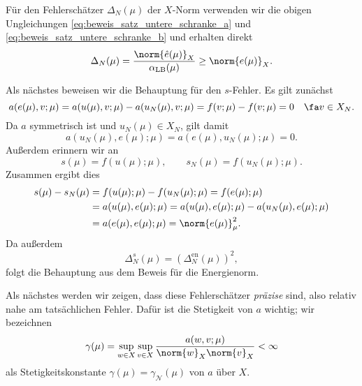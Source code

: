\begin{Satz}
\begin{Beweis}
        Für den Fehlerschätzer $\Delta_N(\mu)$ der $X$-Norm verwenden wir die obigen Ungleichungen \eqref{eq:beweis_satz_untere_schranke_a} und \eqref{eq:beweis_satz_untere_schranke_b} und erhalten direkt
        \begin{equation}
            \Delta_N(\mu) = \frac{\norm{\hat e(\mu)}_X}{\alpha_\text{LB}(\mu)} \geq \norm{e(\mu)}_X.
        \end{equation}

        Als nächstes beweisen wir die Behauptung für den $s$-Fehler. Es gilt zunächst
        \begin{equation}
            a(e(\mu), v; \mu) = a(u(\mu), v; \mu) - a(u_N(\mu), v; \mu) = f(v; \mu) - f(v; \mu) = 0 \quad \fa v \in X_N.
        \end{equation}
        Da $a$ symmetrisch ist und $u_N(\mu) \in X_N$, gilt damit
        \begin{equation}
            a(u_N(\mu), e(\mu); \mu) = a(e(\mu), u_N(\mu); \mu) = 0.
        \end{equation}
        Außerdem erinnern wir an
        \begin{equation}
            s(\mu) = f(u(\mu); \mu), \qquad s_N(\mu) = f(u_N(\mu); \mu).
        \end{equation}
        Zusammen ergibt dies
        \begin{align}
            s(\mu) - s_N(\mu) &= f(u(\mu); \mu) - f(u_N(\mu); \mu) = f(e(\mu); \mu) \\
            &= a(u(\mu), e(\mu); \mu) = a(u(\mu), e(\mu); \mu) - a(u_N(\mu), e(\mu); \mu)\\
            &= a(e(\mu), e(\mu); \mu) = \norm{e(\mu)}_{\mu}^2.
        \end{align}
        Da außerdem
        \begin{equation}
            \Delta^s_N(\mu) = \left( \Delta^{\text{en}}_N(\mu) \right)^2,
        \end{equation}
        folgt die Behauptung aus dem Beweis für die Energienorm.
    \end{Beweis}
\end{Satz}

Als nächstes werden wir zeigen, dass diese Fehlerschätzer \emph{präzise} sind, also relativ nahe am tatsächlichen Fehler.
Dafür ist die Stetigkeit von $a$ wichtig; wir bezeichnen
\begin{equation}
    \gamma(\mu) = \sup_{w\in X} \sup_{v \in X} \frac{a(w, v; \mu)}{\norm{w}_X \norm{v}_X} < \infty
\end{equation}
als Stetigkeitskonstante $\gamma(\mu) = \gamma_{\mathcal N}(\mu)$ von $a$ über $X$.

